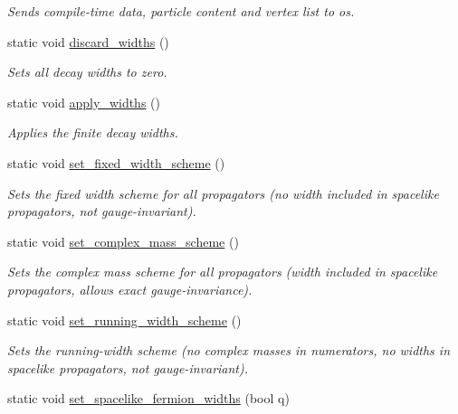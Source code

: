 \begin{DoxyCompactItemize}
\begin{DoxyCompactList}\small\item\em Sends compile-\/time data, particle content and vertex list to os. \end{DoxyCompactList}\item 
\hypertarget{a00370_a387b2e149ddb4ee519fea4d7ce2dc8f9}{static void \hyperlink{a00370_a387b2e149ddb4ee519fea4d7ce2dc8f9}{discard\-\_\-widths} ()}\label{a00370_a387b2e149ddb4ee519fea4d7ce2dc8f9}

\begin{DoxyCompactList}\small\item\em Sets all decay widths to zero. \end{DoxyCompactList}\item 
\hypertarget{a00370_a80902416868d9ee4d19979b8386fd433}{static void \hyperlink{a00370_a80902416868d9ee4d19979b8386fd433}{apply\-\_\-widths} ()}\label{a00370_a80902416868d9ee4d19979b8386fd433}

\begin{DoxyCompactList}\small\item\em Applies the finite decay widths. \end{DoxyCompactList}\item 
static void \hyperlink{a00370_a89e70b576cf3cb5e345bd3252dc01373}{set\-\_\-fixed\-\_\-width\-\_\-scheme} ()
\begin{DoxyCompactList}\small\item\em Sets the fixed width scheme for all propagators (no width included in spacelike propagators, not gauge-\/invariant). \end{DoxyCompactList}\item 
static void \hyperlink{a00370_abf489c248710fb84d0642590b1023db9}{set\-\_\-complex\-\_\-mass\-\_\-scheme} ()
\begin{DoxyCompactList}\small\item\em Sets the complex mass scheme for all propagators (width included in spacelike propagators, allows exact gauge-\/invariance). \end{DoxyCompactList}\item 
static void \hyperlink{a00370_adf237ebf4d679ef7cb395d15617a5b5b}{set\-\_\-running\-\_\-width\-\_\-scheme} ()
\begin{DoxyCompactList}\small\item\em Sets the running-\/width scheme (no complex masses in numerators, no widths in spacelike propagators, not gauge-\/invariant). \end{DoxyCompactList}\item 
\hypertarget{a00370_a788b430717c5cadaa9ffe32dc8bf20a2}{static void \hyperlink{a00370_a788b430717c5cadaa9ffe32dc8bf20a2}{set\-\_\-spacelike\-\_\-fermion\-\_\-widths} (bool q)}\label{a00370_a788b430717c5cadaa9ffe32dc8bf20a2}


\end{DoxyCompactItemize}
